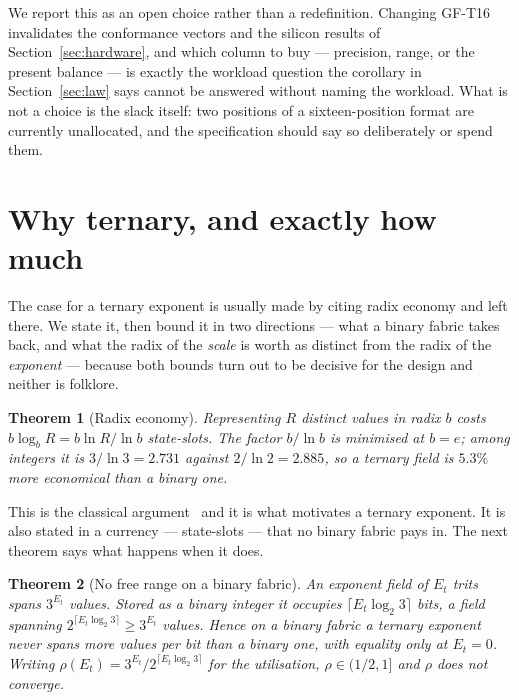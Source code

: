 \documentclass[11pt]{article}
\newtheorem{theorem}{Theorem}
\theoremstyle{definition}
\begin{document}
We report this as an open choice rather than a redefinition. Changing GF-T16
invalidates the conformance vectors and the silicon results of
Section~\ref{sec:hardware}, and which column to buy --- precision, range, or the
present balance --- is exactly the workload question the corollary in
Section~\ref{sec:law} says cannot be answered without naming the workload. What
is not a choice is the slack itself: two positions of a sixteen-position format
are currently unallocated, and the specification should say so deliberately or
spend them.

\section{Why ternary, and exactly how much}\label{sec:whyternary}

The case for a ternary exponent is usually made by citing radix economy and left
there. We state it, then bound it in two directions --- what a binary fabric takes
back, and what the radix of the \emph{scale} is worth as distinct from the radix
of the \emph{exponent} --- because both bounds turn out to be decisive for the
design and neither is folklore.

\begin{theorem}[Radix economy]
\label{thm:economy}
Representing $R$ distinct values in radix $b$ costs $b\log_b R = b\ln R/\ln b$
state-slots. The factor $b/\ln b$ is minimised at $b = e$; among integers it is
$3/\ln 3 = 2.731$ against $2/\ln 2 = 2.885$, so a ternary field is $5.3\%$ more
economical than a binary one.
\end{theorem}

This is the classical argument~\cite{hayes2001,radixeconomy} and it is what
motivates a ternary exponent. It is also stated in a currency --- state-slots ---
that no binary fabric pays in. The next theorem says what happens when it does.

\begin{theorem}[No free range on a binary fabric]
\label{thm:nofree}
An exponent field of $E_t$ trits spans $3^{E_t}$ values. Stored as a binary
integer it occupies $\lceil E_t\log_2 3\rceil$ bits, a field spanning
$2^{\lceil E_t\log_2 3\rceil} \geq 3^{E_t}$ values. Hence on a binary fabric a
ternary exponent never spans more values per bit than a binary one, with equality
only at $E_t = 0$. Writing $\rho(E_t) = 3^{E_t}/2^{\lceil E_t\log_2 3\rceil}$ for
the utilisation, $\rho \in (1/2, 1]$ and $\rho$ does not converge.
\end{theorem}
\end{document}
